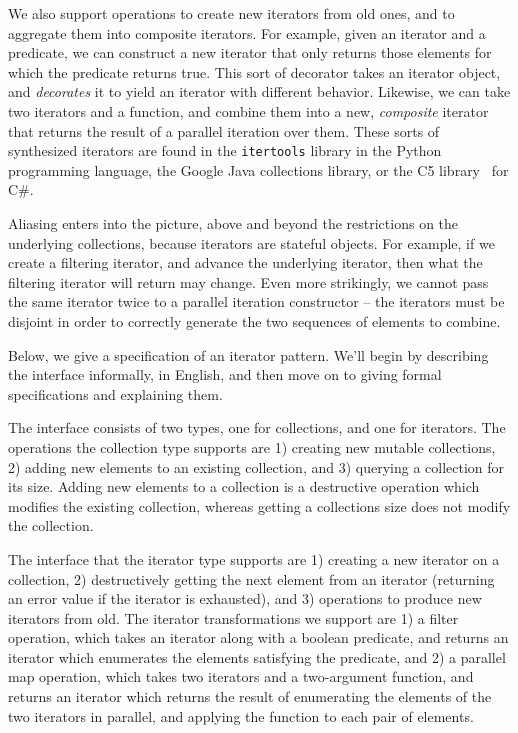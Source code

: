 \documentclass[preprint,natbib]{sigplanconf}
\begin{document}
We also support operations to create new iterators from old ones, and
to aggregate them into composite iterators. For example, given an
iterator and a predicate, we can construct a new iterator that only
returns those elements for which the predicate returns true. This sort
of decorator takes an iterator object, and \emph{decorates} it to
yield an iterator with different behavior. Likewise, we can take two
iterators and a function, and combine them into a new,
\emph{composite} iterator that returns the result of a parallel
iteration over them.  These sorts of synthesized iterators are found
in the \texttt{itertools} library in the Python programming language,
the Google Java collections library, or the C5 library~\cite{C5} for
C\#.

Aliasing enters into the picture, above and beyond the restrictions on
the underlying collections, because iterators are stateful
objects. For example, if we create a filtering iterator, and advance
the underlying iterator, then what the filtering iterator will return
may change. Even more strikingly, we cannot pass the same iterator
twice to a parallel iteration constructor -- the iterators must be
disjoint in order to correctly generate the two sequences of elements
to combine.

Below, we give a specification of an iterator pattern. We'll begin 
by describing the interface informally, in English, and then move on 
to giving formal specifications and explaining them. 

The interface consists of two types, one for collections, and one for
iterators. The operations the collection type supports are 1) creating
new mutable collections, 2) adding new elements to an existing
collection, and 3) querying a collection for its size. Adding new
elements to a collection is a destructive operation which modifies the
existing collection, whereas getting a collections size does not
modify the collection.

The interface that the iterator type supports are 1) creating a new
iterator on a collection, 2) destructively getting the next element
from an iterator (returning an error value if the iterator is
exhausted), and 3) operations to produce new iterators from old. The
iterator transformations we support are 1) a filter operation, which
takes an iterator along with a boolean predicate, and returns an
iterator which enumerates the elements satisfying the predicate, and
2) a parallel map operation, which takes two iterators and a
two-argument function, and returns an iterator which returns the
result of enumerating the elements of the two iterators in parallel,
and applying the function to each pair of elements. 
\end{document}

